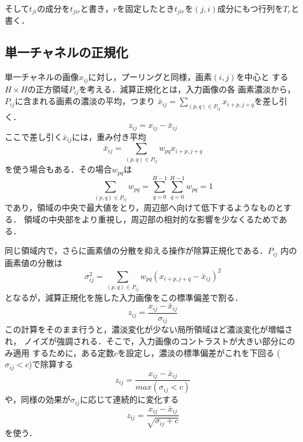 \documentclass[a4paper,10pt]{jsarticle}
\begin{document}
そして$t_{ji}$の成分を$t_{jir}$と書き，$r$を固定したとき$t_{jir}$を$(j,i)$成分にもつ行列を$T_r$と書く．


\subsection{単一チャネルの正規化}
単一チャネルの画像$x_{ij}$に対し，プーリングと同様，画素$(i,j)$を中心と
する$H\times H$の正方領域$P_{ij}$を考える．減算正規化とは，入力画像の各
画素濃淡から，$P_{ij}$に含まれる画素の濃淡の平均，つまり
$\bar{x}_{ij}= \sum_{(p,q)\in{P_{ij}}}^{} x_{i+p,j+q}$を差し引く．
\begin{equation}
 z_{ij} = x_{ij}-\bar{x}_{ij}
\end{equation}
ここで差し引く$\bar{x}_{ij}$には，重み付き平均
\begin{equation}
 \bar{x}_{ij}=\sum_{(p,q)\in{P_{ij}}} w_{pq}x_{i+p,j+q}
\end{equation}
を使う場合もある．その場合$w_{pq}$は
\begin{equation}
  \sum_{(p,q)\in{P_{ij}}}^{} w_{pq} = \sum_{q=0}^{H-1} \sum_{q=0}^{H-1} w_{pq}=1
\end{equation}
であり，領域の中央で最大値をとり，周辺部へ向けて低下するようなものとする．
領域の中央部をより重視し，周辺部の相対的な影響を少なくるためである．

同じ領域内で，さらに画素値の分散を抑える操作が除算正規化である．$P_{ij}$
内の画素値の分散は
\begin{equation}
 \sigma^2_{ij}=\sum_{(p,q)\in{P_{ij}}}^{} w_{pq}(x_{i+p,j+q}-\bar{x}_{ij})^2
\end{equation}
となるが，減算正規化を施した入力画像をこの標準偏差で割る．
\begin{equation}
 z_{ij}=\frac{x_{ij}-\bar{x}_{ij}}{\sigma_{ij}}
\end{equation}
この計算をそのまま行うと，濃淡変化が少ない局所領域ほど濃淡変化が増幅され，
ノイズが強調される．そこで，入力画像のコントラストが大きい部分にのみ適用
するために，ある定数$c$を設定し，濃淡の標準偏差がこれを下回る
($\sigma_{ij}<c$)で除算する
\begin{equation}
 z_{ij}=\frac{x_{ij}-\bar{x}_{ij}}{max(\sigma_{ij}<c)}
\end{equation}
や，同様の効果が$\sigma_{ij}$に応じて連続的に変化する
\begin{equation}
 z_{ij}=\frac{x_{ij}-\bar{x}_{ij}}{\sqrt{\sigma_{ij}+c}}
\end{equation}
を使う．%
\end{document}
